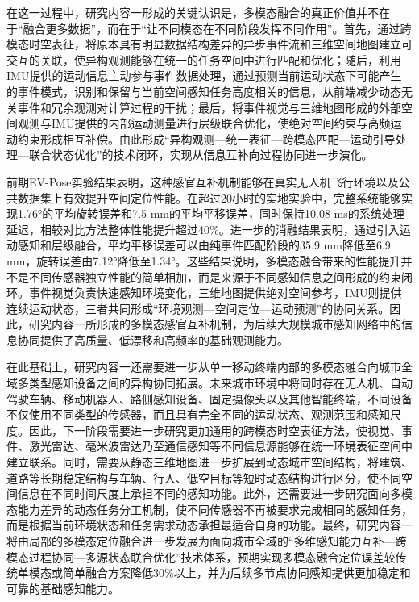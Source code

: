 在这一过程中，研究内容一形成的关键认识是，多模态融合的真正价值并不在于“融合更多数据”，而在于“让不同模态在不同阶段发挥不同作用”。首先，通过跨模态时空表征，将原本具有明显数据结构差异的异步事件流和三维空间地图建立可交互的关联，使异构观测能够在统一的任务空间中进行匹配和优化；随后，利用IMU提供的运动信息主动参与事件数据处理，通过预测当前运动状态下可能产生的事件模式，识别和保留与当前空间感知任务高度相关的信息，从前端减少动态无关事件和冗余观测对计算过程的干扰；最后，将事件视觉与三维地图形成的外部空间观测与IMU提供的内部运动测量进行层级联合优化，使绝对空间约束与高频运动约束形成相互补偿。由此形成“异构观测—统一表征—跨模态匹配—运动引导处理—联合状态优化”的技术闭环，实现从信息互补向过程协同进一步演化。

前期EV-Pose实验结果表明，这种感官互补机制能够在真实无人机飞行环境以及公共数据集上有效提升空间定位性能。在超过20小时的实地实验中，完整系统能够实现1.76°的平均旋转误差和7.5 mm的平均平移误差，同时保持10.08 ms的系统处理延迟，相较对比方法整体性能提升超过40\%。进一步的消融结果表明，通过引入运动感知和层级融合，平均平移误差可以由纯事件匹配阶段的35.9 mm降低至6.9 mm，旋转误差由7.12°降低至1.34°。这些结果说明，多模态融合带来的性能提升并不是不同传感器独立性能的简单相加，而是来源于不同感知信息之间形成的约束闭环。事件视觉负责快速感知环境变化，三维地图提供绝对空间参考，IMU则提供连续运动状态，三者共同形成“环境观测—空间定位—运动预测”的协同关系。因此，研究内容一所形成的多模态感官互补机制，为后续大规模城市感知网络中的信息协同提供了高质量、低漂移和高频率的基础观测能力。

在此基础上，研究内容一还需要进一步从单一移动终端内部的多模态融合向城市全域多类型感知设备之间的异构协同拓展。未来城市环境中将同时存在无人机、自动驾驶车辆、移动机器人、路侧感知设备、固定摄像头以及其他智能终端，不同设备不仅使用不同类型的传感器，而且具有完全不同的运动状态、观测范围和感知尺度。因此，下一阶段需要进一步研究更加通用的跨模态时空表征方法，使视觉、事件、激光雷达、毫米波雷达乃至通信感知等不同信息源能够在统一环境表征空间中建立联系。同时，需要从静态三维地图进一步扩展到动态城市空间结构，将建筑、道路等长期稳定结构与车辆、行人、低空目标等短时动态结构进行区分，使不同空间信息在不同时间尺度上承担不同的感知功能。此外，还需要进一步研究面向多模态能力差异的动态任务分工机制，使不同传感器不再被要求完成相同的感知任务，而是根据当前环境状态和任务需求动态承担最适合自身的功能。最终，研究内容一将由局部的多模态定位融合进一步发展为面向城市全域的“多维感知能力互补—跨模态过程协同—多源状态联合优化”技术体系，预期实现多模态融合定位误差较传统单模态或简单融合方案降低30\%以上，并为后续多节点协同感知提供更加稳定和可靠的基础感知能力。

